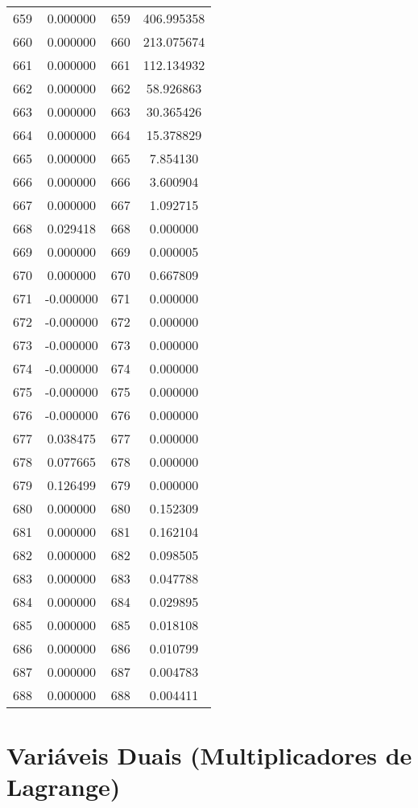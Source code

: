 \documentclass[12pt]{article}
\begin{document}
\begin{longtable}{@{}cccc@{}}
659 & 0.000000 & 659 & 406.995358 \\
660 & 0.000000 & 660 & 213.075674 \\
661 & 0.000000 & 661 & 112.134932 \\
662 & 0.000000 & 662 & 58.926863 \\
663 & 0.000000 & 663 & 30.365426 \\
664 & 0.000000 & 664 & 15.378829 \\
665 & 0.000000 & 665 & 7.854130 \\
666 & 0.000000 & 666 & 3.600904 \\
667 & 0.000000 & 667 & 1.092715 \\
668 & 0.029418 & 668 & 0.000000 \\
669 & 0.000000 & 669 & 0.000005 \\
670 & 0.000000 & 670 & 0.667809 \\
671 & -0.000000 & 671 & 0.000000 \\
672 & -0.000000 & 672 & 0.000000 \\
673 & -0.000000 & 673 & 0.000000 \\
674 & -0.000000 & 674 & 0.000000 \\
675 & -0.000000 & 675 & 0.000000 \\
676 & -0.000000 & 676 & 0.000000 \\
677 & 0.038475 & 677 & 0.000000 \\
678 & 0.077665 & 678 & 0.000000 \\
679 & 0.126499 & 679 & 0.000000 \\
680 & 0.000000 & 680 & 0.152309 \\
681 & 0.000000 & 681 & 0.162104 \\
682 & 0.000000 & 682 & 0.098505 \\
683 & 0.000000 & 683 & 0.047788 \\
684 & 0.000000 & 684 & 0.029895 \\
685 & 0.000000 & 685 & 0.018108 \\
686 & 0.000000 & 686 & 0.010799 \\
687 & 0.000000 & 687 & 0.004783 \\
688 & 0.000000 & 688 & 0.004411 \\

\end{longtable}

\section{Variáveis Duais (Multiplicadores de Lagrange)}
\end{document}
